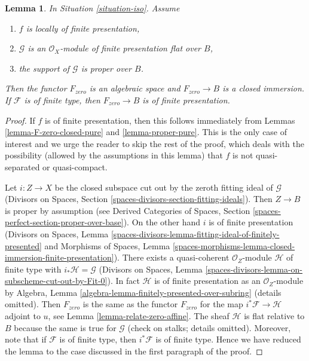 \documentclass{stacks-project}
\theoremstyle{plain}
\newtheorem{lemma}[subsection]{Lemma}
\theoremstyle{definition}
\theoremstyle{remark}
\numberwithin{equation}{subsection}
\begin{document}
\begin{lemma}
\label{lemma-F-zero-closed-proper}
In Situation \ref{situation-iso}. Assume
\begin{enumerate}
\item $f$ is locally of finite presentation,
\item $\mathcal{G}$ is an $\mathcal{O}_X$-module of finite presentation
flat over $B$,
\item the support of $\mathcal{G}$ is proper over $B$.
\end{enumerate}
Then the functor $F_{zero}$ is an algebraic space and $F_{zero} \to B$
is a closed immersion. If $\mathcal{F}$ is of finite type, then
$F_{zero} \to B$ is of finite presentation.
\end{lemma}

\begin{proof}
If $f$ is of finite presentation, then this follows immediately from
Lemmas \ref{lemma-F-zero-closed-pure} and \ref{lemma-proper-pure}.
This is the only case of interest and we urge the reader to skip
the rest of the proof, which deals with the possibility (allowed
by the assumptions in this lemma)
that $f$ is not quasi-separated or quasi-compact.

\medskip\noindent
Let $i : Z \to X$ be the closed subspace cut out by the zeroth
fitting ideal of $\mathcal{G}$
(Divisors on Spaces, Section
\ref{spaces-divisors-section-fitting-ideals}).
Then $Z \to B$ is proper by assumption (see
Derived Categories of Spaces, Section
\ref{spaces-perfect-section-proper-over-base}).
On the other hand $i$ is of finite presentation
(Divisors on Spaces, Lemma
\ref{spaces-divisors-lemma-fitting-ideal-of-finitely-presented} and
Morphisms of Spaces, Lemma
\ref{spaces-morphisms-lemma-closed-immersion-finite-presentation}).
There exists a quasi-coherent $\mathcal{O}_Z$-module
$\mathcal{H}$ of finite type with $i_*\mathcal{H} = \mathcal{G}$
(Divisors on Spaces, Lemma
\ref{spaces-divisors-lemma-on-subscheme-cut-out-by-Fit-0}).
In fact $\mathcal{H}$ is of finite presentation as an $\mathcal{O}_Z$-module
by Algebra, Lemma \ref{algebra-lemma-finitely-presented-over-subring}
(details omitted).
Then $F_{zero}$ is the same as the functor $F_{zero}$
for the map $i^*\mathcal{F} \to \mathcal{H}$ adjoint to $u$, see
Lemma \ref{lemma-relate-zero-affine}.
The sheaf $\mathcal{H}$ is flat relative to $B$ because
the same is true for $\mathcal{G}$ (check on stalks; details omitted).
Moreover, note that if $\mathcal{F}$ is of finite type,
then $i^*\mathcal{F}$ is of finite type.
Hence we have reduced the lemma to the case
discussed in the first paragraph of the proof.
\end{proof}
\end{document}
